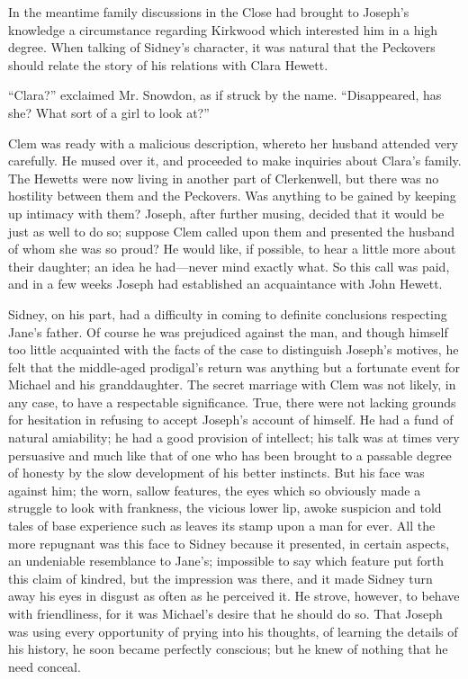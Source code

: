 In the meantime family discussions in the Close had brought to Joseph's
knowledge a circumstance regarding Kirkwood which interested him in a
high degree. When talking of Sidney's character, it was natural that the
Peckovers should relate the story of his relations with Clara Hewett.

``Clara?'' exclaimed Mr. Snowdon, as if struck by the name.
``Disappeared, has she? What sort of a girl to look at?''

Clem was ready with a malicious description, whereto her husband
attended very carefully. He mused over it, and proceeded to {}make
inquiries about Clara's family. The Hewetts were now living in another
part of Clerkenwell, but there was no hostility between them and the
Peckovers. Was anything to be gained by keeping up intimacy with them?
Joseph, after further musing, decided that it would be just as well to
do so; suppose Clem called upon them and presented the husband of whom
she was so proud? He would like, if possible, to hear a little more
about their daughter; an idea he had---never mind exactly what. So this
call was paid, and in a few weeks Joseph had established an acquaintance
with John Hewett.

Sidney, on his part, had a difficulty in coming to definite conclusions
respecting Jane's father. Of course he was prejudiced against the man,
and though himself too little acquainted with the facts of the case to
distinguish Joseph's motives, he felt that the middle-aged prodigal's
return was anything but a fortunate event for Michael and his
granddaughter. The secret marriage with Clem was not likely, in any
case, to have a {}respectable significance. True, there were not lacking
grounds for hesitation in refusing to accept Joseph's account of
himself. He had a fund of natural amiability; he had a good provision of
intellect; his talk was at times very persuasive and much like that of
one who has been brought to a passable degree of honesty by the slow
development of his better instincts. But his face was against him; the
worn, sallow features, the eyes which so obviously made a struggle to
look with frankness, the vicious lower lip, awoke suspicion and told
tales of base experience such as leaves its stamp upon a man for ever.
All the more repugnant was this face to Sidney because it presented, in
certain aspects, an undeniable resemblance to Jane's; impossible to say
which feature put forth this claim of kindred, but the impression was
there, and it made Sidney turn away his eyes in disgust as often as he
perceived it. He strove, however, to behave with friendliness, for it
was Michael's desire that he should do so. That Joseph was using every
opportunity {}of prying into his thoughts, of learning the details of
his history, he soon became perfectly conscious; but he knew of nothing
that he need conceal.

